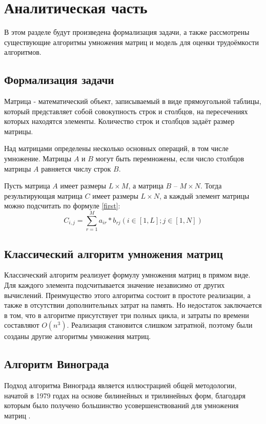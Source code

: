 \chapter{Аналитическая часть}
В этом разделе будут произведена формализация задачи, а также 
рассмотрены существующие алгоритмы умножения матриц и модель для
оценки трудоёмкости алгоритмов.

\section{Формализация задачи}
Матрица - математический объект, записываемый в виде прямоугольной таблицы, который представляет
собой совокупность строк и столбцов, на пересечениях которых находятся элементы. Количество строк
и столбцов задаёт размер матрицы.

Над матрицами определены несколько основных операций, в том числе умножение. Матрицы $A$ и $B$ 
могут быть перемножены, если число столбцов матрицы $A$ равняется числу строк $B$.

Пусть матрица $A$ имеет размеры $L \times M$, а матрица $B$ -- $M \times N$. Тогда результирующая матрица
$C$ имеет размеры $L\times N$, а каждый элемент матрицы можно подсчитать по формуле \ref{first}:
\begin{equation}
	\label{first}
	C_{i, j} = \sum\limits_{r=1}^M a_{ir} * b_{rj}   (i\in[1, L]; j\in[1, N])
\end{equation}

\section{Классический алгоритм умножения матриц}
Классический алгоритм реализует формулу умножения матриц в прямом виде. Для каждого элемента
подсчитывается значение независимо от других вычислений. Преимущество этого алгоритма состоит 
в простоте реализации, а также в отсутствии дополнительных затрат на память. Но недостаток заключается
в том, что в алгоритме присутствует три полных цикла, и затраты по времени составляют $O(n^3)$. 
Реализация становится слишком затратной, поэтому были созданы другие алгоритмы умножения матриц.

\section{Алгоритм Винограда}
Подход алгоритма Винограда является иллюстрацией общей методологии, начатой в 1979 годах на основе билинейных и трилинейных форм, 
благодаря которым было получено большинство усовершенствований для умножения матриц \cite{vino}.

